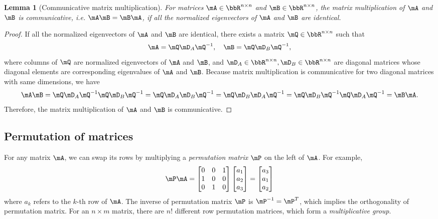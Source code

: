 \documentclass[11pt]{article}
\theoremstyle{plain}
\newtheorem{lem}{Lemma}
\theoremstyle{definition}
\begin{document}
\begin{lem}[Communicative matrix multiplication]\label{lem:matrixcomm} For matrices $\mA \in \bbR^{n \times n}$ and $\mB \in \bbR^{n \times n}$, the matrix multiplication of $\mA$ and $\mB$ is communicative, i.e. $\mA\mB  = \mB \mA$, if all the normalized eigenvectors of $\mA$ and $\mB$ are identical.	
\end{lem}

\begin{proof}
	If all the normalized eigenvectors of $\mA$ and $\mB$ are identical, there exists a matrix $\mQ \in \bbR^{n \times n}$ such that
	\[ \mA = \mQ \mD_A \mQ^{-1}, \quad \mB = \mQ \mD_B \mQ^{-1},\]
	where columns of $\mQ$ are normalized eigenvectors of $\mA$ and $\mB$, and $\mD_A\in\bbR^{n \times n},  \mD_B\in\bbR^{n \times n} $ are diagonal matrices whose diagonal elements are corresponding eigenvalues of $\mA$ and $\mB$. Because matrix multiplication is communicative for two diagonal matrices with same dimensions, we have
	\[  \mA \mB = \mQ \mD_A \mQ^{-1} \mQ \mD_B \mQ^{-1} = \mQ \mD_A \mD_B \mQ^{-1}  =\mQ \mD_B \mD_A \mQ^{-1} = \mQ \mD_B \mQ^{-1} \mQ \mD_A \mQ^{-1}  = \mB \mA .\]
	Therefore, the matrix multiplication of $\mA$ and $\mB$ is communicative.
\end{proof}

\subsection{Permutation of matrices}
For any matrix $\mA$, we can swap its rows by multiplying a \textit{permutation matrix } $\mP$ on the left of $\mA$. For example,
\begin{align}
	\mP \mA = \begin{bmatrix}
		0 &0&1\\1 & 0 & 0\\ 0 & 1 & 0 
	\end{bmatrix}  \begin{bmatrix}
		a_1\\a_2\\ a_3
	\end{bmatrix}  = \begin{bmatrix}
		a_3\\a_1\\ a_2
	\end{bmatrix}
\end{align}
where $a_k$ refers to the $k$-th row of $\mA$. The inverse of permutation matrix $\mP$ is $\mP^{-1} = \mP^T$, which implies the orthogonality of permutation matrix. For an $n \times m$ matrix, there are $n!$ different row permutation matrices, which form a \textit{multiplicative group}.
\end{document}
